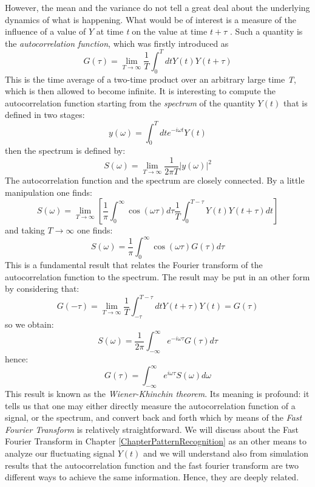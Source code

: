 \documentclass[12pt,a4paper]{report}
\begin{document}
However, the mean and the variance do not tell a great deal about the underlying dynamics of what is happening. What would be of interest is a measure of the influence of a value of $Y$ at time \emph{t} on the value at time $t + \tau$ \cite{Hand}. Such a quantity is the \emph{autocorrelation function}, which was firstly introduced as
\begin{equation}
    G(\tau) = \lim_{T\to\infty}\frac{1}{T}\int_{0}^{T}dt Y(t)Y(t+\tau) 
\end{equation}
This is the time average of a two-time product over an arbitrary large time \emph{T}, which is then allowed to become infinite. It is interesting to compute the autocorrelation function starting from the \emph{spectrum} of the quantity $Y(t)$ that is defined in two stages:
\begin{equation}
 y(\omega) = \int_{0}^{T} dt e^{-i\omega t} Y(t)
\end{equation}
then the spectrum is defined by:
\begin{equation}
 S(\omega) = \lim_{T\to\infty}\frac{1}{2 \pi T}|y(\omega)|^{2}
\end{equation}
The autocorrelation function and the spectrum are closely connected. By a little manipulation one finds:
\begin{equation}
 S(\omega) = \lim_{T\to\infty}\left[\frac{1}{\pi}\int_{0}^{\infty} \cos(\omega\tau)d\tau \frac{1}{T}\int_{0}^{T-\tau} Y(t)Y(t+\tau)dt \right]
\end{equation}
and taking $T\to\infty$ one finds:
\begin{equation}
S(\omega) = \frac{1}{\pi}\int_{0}^{\infty} \cos(\omega\tau)G(\tau)d\tau
\end{equation}
This is a fundamental result that relates the Fourier transform of the autocorrelation function to the spectrum. The result may be put in an other form by considering that:
\begin{equation}
 G(-\tau)= \lim_{T\to\infty}\frac{1}{T}\int_{-\tau}^{T-\tau} dt Y(t+\tau)Y(t) = G(\tau)
\end{equation}
so we obtain:
\begin{equation}
 S(\omega) = \frac{1}{2\pi}\int_{-\infty}^{\infty}e^{-i\omega\tau}G(\tau)d\tau
\end{equation}
hence:
\begin{equation}
 G(\tau) = \int_{-\infty}^{\infty}e^{i\omega\tau}S(\omega)d\omega
\end{equation}
This result is known as the \emph{Wiener-Khinchin theorem}. Its meaning is profound: it tells us that one may either directly measure the autocorrelation function of a signal, or the spectrum, and convert back and forth which by means of the \emph{Fast Fourier Transform} is relatively straightforward. We will discuss about the Fast Fourier Transform in Chapter \ref{ChapterPatternRecognition} as an other means to analyze our fluctuating signal $Y(t)$ and we will understand also from simulation results that the autocorrelation function and the fast fourier transform are two different ways to achieve the same information. Hence, they are deeply related.
\end{document}
